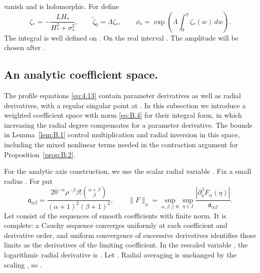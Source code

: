 %
vanish and  is holomorphic. For
 define
\begin{equation}
  \zeta_*=-\frac{LH_*}{H_*^2+\sigma_*^2},
  \qquad \widetilde\zeta_0=\Lambda\zeta_*,
  \qquad \phi_*=\exp\!\left(\Lambda\int_0^\eta \zeta_*(w)\,dw\right).
  \tag{B.3}\label{eq:B.3}
\end{equation}
The integral is well defined on . On the real interval
. The amplitude  will be chosen after
.

\subsection{An analytic coefficient space.}\label{sec:B.2}
The profile equations \eqref{eq:4.13} contain parameter derivatives as well as radial derivatives,
with a regular singular point at . In this subsection we introduce a
weighted coefficient space  with norm \eqref{eq:B.4} for their
integral form, in which increasing the radial degree compensates for a parameter derivative. The
bounds in Lemma~\ref{lem:B.1} control multiplication and radial inversion in this space, including
the mixed nonlinear terms needed in the contraction argument for Proposition~\ref{prop:B.2}.

For the analytic axis construction, we use the scalar radial variable
. Fix a small radius . For
 put
\begin{equation}
  \mathfrak a_{\alpha\beta}
  =\frac{20^{-\alpha}\rho^{-\beta}\beta!\binom{\alpha+\beta}{\beta}}
         {(\alpha+1)^2(\beta+1)^2},
  \qquad
  \lVert F\rVert_\rho
  =\sup_{\alpha,\beta\geq0}\sup_{\eta\in I}
    \frac{|\partial_\eta^\beta F_\alpha(\eta)|}{\mathfrak a_{\alpha\beta}}.
  \tag{B.4}\label{eq:B.4}
\end{equation}
Let  consist of the sequences of smooth coefficients with
finite norm. It is complete: a Cauchy sequence converges uniformly at each coefficient and
derivative order, and uniform convergence of successive derivatives identifies those limits as
the derivatives of the limiting coefficient. In the rescaled variable ,
the logarithmic radial derivative is
. Let
. Radial averaging is unchanged by
the scaling , so
.

